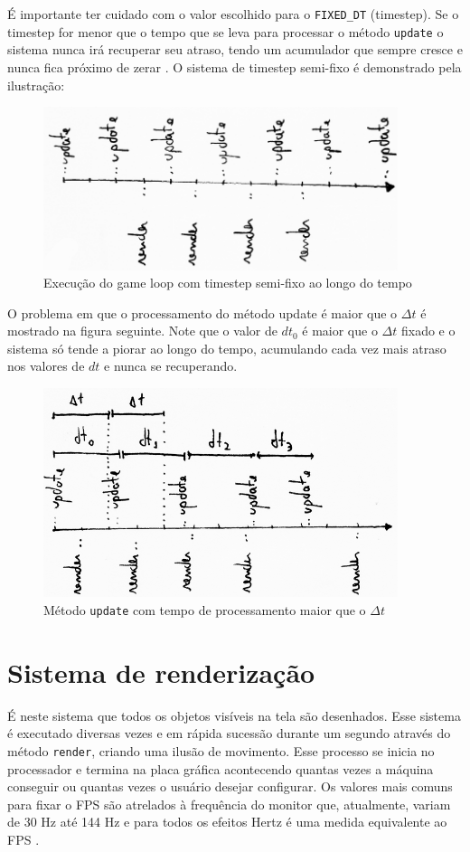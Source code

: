 \documentclass[12pt, 
openright, 
oneside, 
a4paper,    
brazil]{facom-ufu-abntex2}
\begin{document}
É importante ter cuidado com o valor escolhido para o \texttt{FIXED_DT} (timestep). Se o timestep for menor que o tempo que se leva para processar o método \texttt{update} o sistema nunca irá recuperar seu atraso, tendo um acumulador que sempre cresce e nunca fica próximo de zerar \cite{GameProgrammingPatterns}.
O sistema de timestep semi-fixo é demonstrado pela ilustração:
\begin{figure}[H]
	\centering
	\includegraphics[width=28em]{imagens/ilu6_small.png}
	\caption{Execução do game loop com timestep semi-fixo ao longo do tempo}
\end{figure}
O problema em que o processamento do método update é maior que o $\Delta t$ é mostrado na figura seguinte. Note que o valor de $dt_0$ é maior que o $\Delta t$ fixado e o sistema só tende a piorar ao longo do tempo, acumulando cada vez mais atraso nos valores de $dt$ e nunca se recuperando.
\begin{figure}[H]
	\centering
	\includegraphics[width=28em]{imagens/ilu8_small.png}
	\caption{Método \texttt{update} com tempo de processamento maior que o $\Delta t$}
\end{figure}
 
\section{Sistema de renderização}
É neste sistema que todos os objetos visíveis na tela são desenhados. Esse sistema é executado diversas vezes e em rápida sucessão durante um segundo através do método \texttt{render}, criando uma ilusão de movimento. Esse processo se inicia no processador e termina na placa gráfica acontecendo quantas vezes a máquina conseguir ou quantas vezes o usuário desejar configurar. Os valores mais comuns para fixar o FPS são atrelados à frequência do monitor que, atualmente, variam de 30 Hz até 144 Hz e para todos os efeitos Hertz é uma medida equivalente ao FPS \cite{GameEngineArchitecture}.
\end{document}
